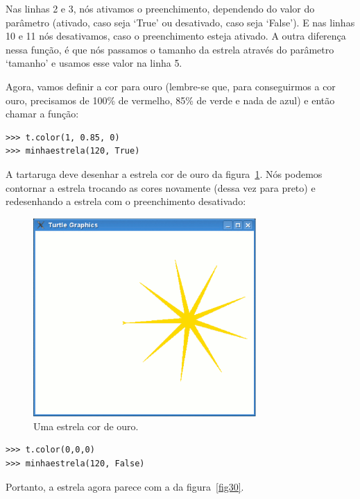 {Nas linhas 2 e 3, nós ativamos o preenchimento, dependendo do valor do parâmetro  (ativado, caso seja `True' ou desativado, caso seja `False'). E nas linhas 10 e 11 nós desativamos, caso o preenchimento esteja ativado. A outra diferença nessa função, é que nós passamos o tamanho da estrela através do parâmetro `tamanho' e usamos esse valor na linha 5.
\par
Agora, vamos definir a cor para ouro (lembre-se que, para conseguirmos a cor ouro, precisamos de 100\% de vermelho, 85\% de verde e nada de azul) e então chamar a função:

\begin{listing}
\begin{verbatim}
>>> t.color(1, 0.85, 0)
>>> minhaestrela(120, True)
\end{verbatim}
\end{listing}

\noindent
A tartaruga deve desenhar a estrela cor de ouro da figura~\ref{fig29}. Nós podemos contornar a estrela trocando as cores novamente (dessa vez para preto) e redesenhando a estrela com o preenchimento desativado:

\begin{figure}
\begin{center}
\includegraphics[width=85mm]{eps/figure29.eps}
\end{center}
\caption{Uma estrela cor de ouro.}\label{fig29}
\end{figure}

\begin{listing}
\begin{verbatim}
>>> t.color(0,0,0)
>>> minhaestrela(120, False)
\end{verbatim}
\end{listing}

\noindent
Portanto, a estrela agora parece com a da figura~\ref{fig30}.

}

